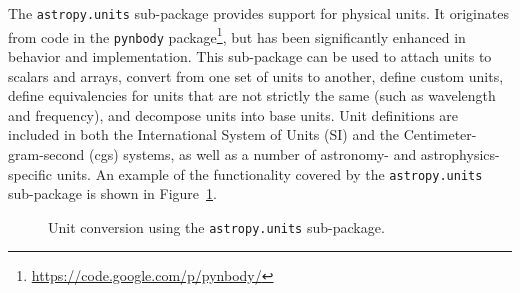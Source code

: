 \documentclass[traditabstract]{aa}
\begin{document}
The \texttt{astropy.units} sub-package provides support for physical units. It
originates from code in the \texttt{pynbody}
package\footnote{\url{https://code.google.com/p/pynbody/}}, but has been
significantly enhanced in behavior and implementation. This sub-package can be
used to attach units to scalars and arrays, convert from one set of units to
another, define custom units, define equivalencies for units that are not
strictly the same (such as wavelength and frequency), and decompose units
into base units. Unit definitions are included in both the International
System of Units (SI) and the Centimeter-gram-second (cgs) systems, as well as
a number of astronomy- and astrophysics-specific units. An example of the
functionality covered by the \texttt{astropy.units} sub-package is shown in
Figure~\ref{code:units}.
\begin{figure}
\caption{Unit conversion using the \texttt{astropy.units} sub-package.\label{code:units}}

\end{figure}
\end{document}
